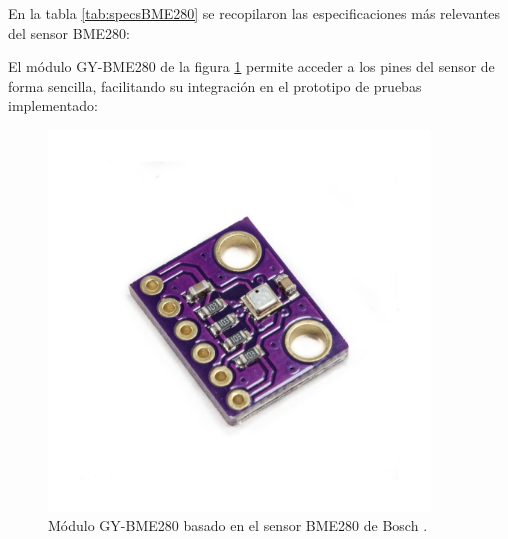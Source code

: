 En la tabla \ref{tab:specsBME280} se recopilaron las especificaciones más relevantes del sensor BME280:

\begin{table}[H]
    \centering
    \caption{Especificaciones del sensor BME280 de Bosch.}
    \label{tab:specsBME280}
    \end{table}

El módulo GY-BME280 de la figura \ref{fig:bme280} permite acceder a los pines del sensor de forma sencilla, facilitando su integración en el prototipo de pruebas implementado:

\begin{figure}[H]
    \centering
    \includegraphics[width = 0.9\textwidth]{imagenes/cap2_marcometod/BME280BREAKOUT.jpeg}
    \caption{Módulo GY-BME280 basado en el sensor BME280 de Bosch \citep{bme280}.}
    \label{fig:bme280}
\end{figure}

